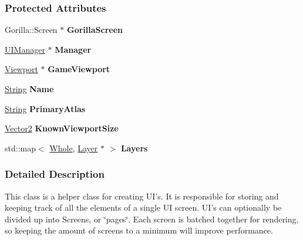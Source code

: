 \subsubsection*{Protected Attributes}
\begin{DoxyCompactItemize}
\item 
\hypertarget{classphys_1_1UI_1_1Screen_ac8762cf8cb98bed550d25640cf7fc937}{
Gorilla::Screen $\ast$ {\bfseries GorillaScreen}}
\label{classphys_1_1UI_1_1Screen_ac8762cf8cb98bed550d25640cf7fc937}

\item 
\hypertarget{classphys_1_1UI_1_1Screen_a0a74a8abe7b12bb01bd0a50d5cba722c}{
\hyperlink{classphys_1_1UIManager}{UIManager} $\ast$ {\bfseries Manager}}
\label{classphys_1_1UI_1_1Screen_a0a74a8abe7b12bb01bd0a50d5cba722c}

\item 
\hypertarget{classphys_1_1UI_1_1Screen_a6fbbce53e571b77cc52bdf78a54e5f38}{
\hyperlink{classphys_1_1Viewport}{Viewport} $\ast$ {\bfseries GameViewport}}
\label{classphys_1_1UI_1_1Screen_a6fbbce53e571b77cc52bdf78a54e5f38}

\item 
\hypertarget{classphys_1_1UI_1_1Screen_a10e62b7ae053e64037868baabe100c4b}{
\hyperlink{namespacephys_aa03900411993de7fbfec4789bc1d392e}{String} {\bfseries Name}}
\label{classphys_1_1UI_1_1Screen_a10e62b7ae053e64037868baabe100c4b}

\item 
\hypertarget{classphys_1_1UI_1_1Screen_ac16a50bdd84ca1a4bda835931490da02}{
\hyperlink{namespacephys_aa03900411993de7fbfec4789bc1d392e}{String} {\bfseries PrimaryAtlas}}
\label{classphys_1_1UI_1_1Screen_ac16a50bdd84ca1a4bda835931490da02}

\item 
\hypertarget{classphys_1_1UI_1_1Screen_ae62627f276dff5213deb9178bce80be0}{
\hyperlink{classphys_1_1Vector2}{Vector2} {\bfseries KnownViewportSize}}
\label{classphys_1_1UI_1_1Screen_ae62627f276dff5213deb9178bce80be0}

\item 
\hypertarget{classphys_1_1UI_1_1Screen_a1375e2cd9b01a13e47b0ab867245afbb}{
std::map$<$ \hyperlink{namespacephys_a460f6bc24c8dd347b05e0366ae34f34a}{Whole}, \hyperlink{classphys_1_1UI_1_1Layer}{Layer} $\ast$ $>$ {\bfseries Layers}}
\label{classphys_1_1UI_1_1Screen_a1375e2cd9b01a13e47b0ab867245afbb}

\end{DoxyCompactItemize}


\subsubsection{Detailed Description}
This class is a helper class for creating UI's. It is responsible for storing and keeping track of all the elements of a single UI screen. UI's can optionally be divided up into Screens, or \char`\"{}pages\char`\"{}. Each screen is batched together for rendering, so keeping the amount of screens to a minimum will improve performance. 

